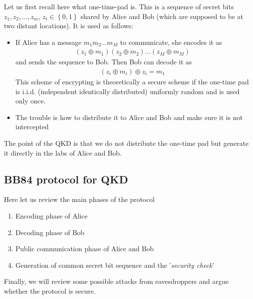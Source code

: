 \begin{framedremark}


    Let us first recall here what one-time-pad is. This is a sequence of secret bits $z_1, z_2, \ldots, z_m$, $z_i \in \left\{0, 1\right\}$ shared by Alice and Bob (which are supposed to be at two distant locations). It is used as follows:
	\begin{itemize}
	    \item If Alice has a message $m_1m_2\ldots m_M$ to communicate, she encodes it as 
			\begin{align*} 
				\left(z_1 \oplus m_1\right)\left(z_2 \oplus m_2\right)\ldots \left(z_M \oplus m_M\right)
			\end{align*}
			and sends the sequence to Bob. Then Bob can decode it as 
			\begin{align*} 
				\left(z_i \oplus m_i\right) \oplus z_i = m_1 
			\end{align*}
			This scheme of encrypting is theoretically a secure scheme if the one-time pad is i.i.d. (independent identically distributed) uniformly random and is used only once.
			\item The trouble is how to distribute it to Alice and Bob and make sure it is not intercepted
	\end{itemize}


\end{framedremark}

\begin{center}
    The point of the QKD is that we do not distribute the one-time pad but generate it directly in the labs of Alice and Bob.
\end{center}


\subsection{BB84 protocol for QKD}
Here let us review the main phases of the protocol
\begin{enumerate}
    \item Encoding phase of Alice
    \item Decoding phase of Bob
    \item Public communication phase of Alice and Bob
    \item Generation of common secret bit sequence and the '\textit{security check}'
\end{enumerate}
Finally, we will review some possible attacks from eavesdroppers and argue whether the protocol is secure.

